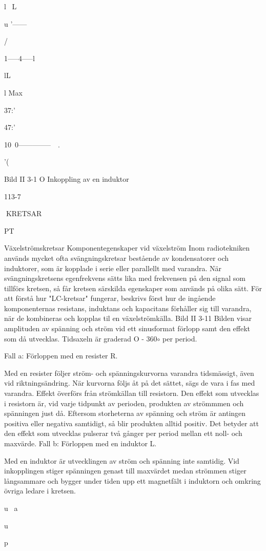 l~
L

u
'------{ /

1-----4-----l

lL

l Max

37:'

47:'

10~0--------------~~.

'(

Bild II 3-1 O Inkoppling av en induktor

113-7

KRETSAR

PT

Växelströmskretsar
Komponentegenskaper vid växelström
Inom radiotekniken används mycket ofta
svängningskretsar bestående av kondensatorer och induktorer, som är kopplade i serie
eller parallellt med varandra. När svängningskretsens egenfrekvens sätts lika med
frekvensen på den signal som tillförs kretsen, så får kretsen särskilda egenskaper
som används på olika sätt.
För att förstå hur "LC-kretsar" fungerar,
beskrivs först hur de ingående komponenternas resistans, induktans och kapacitans
förhåller sig till varandra, när de kombineras
och kopplas til en växelströmkälla.
Bild II 3-11
Bilden visar amplituden av spänning och
ström vid ett sinusformat förlopp samt den
effekt som då utvecklas. Tidsaxeln är graderad O - 360\(\circ\) per period.

Fall a: Förloppen med en resister R.

Med en resister följer ström- och spänningskurvorna varandra tidsmässigt, även
vid riktningsändring. När kurvorna följs åt på
det sättet, sägs de vara i fas med varandra.
Effekt överförs från strömkällan till resistorn. Den effekt som utvecklas i resistorn är,
vid varje tidpunkt av perioden, produkten av
strömmmen och spänningen just då. Eftersom storheterna av spänning och ström är
antingen positiva eller negativa samtidigt, så
blir produkten alltid positiv. Det betyder att
den effekt som utvecklas pulserar två gånger per period mellan ett noll- och maxvärde.
Fall b: Förloppen med en induktor L.

Med en induktor är utvecklingen av ström
och spänning inte samtidig. Vid inkopplingen stiger spänningen genast till maxvärdet
medan strömmen stiger långsammare och
bygger under tiden upp ett magnetfält i induktorn och omkring övriga ledare i kretsen.

u~
a

u~

p

}
